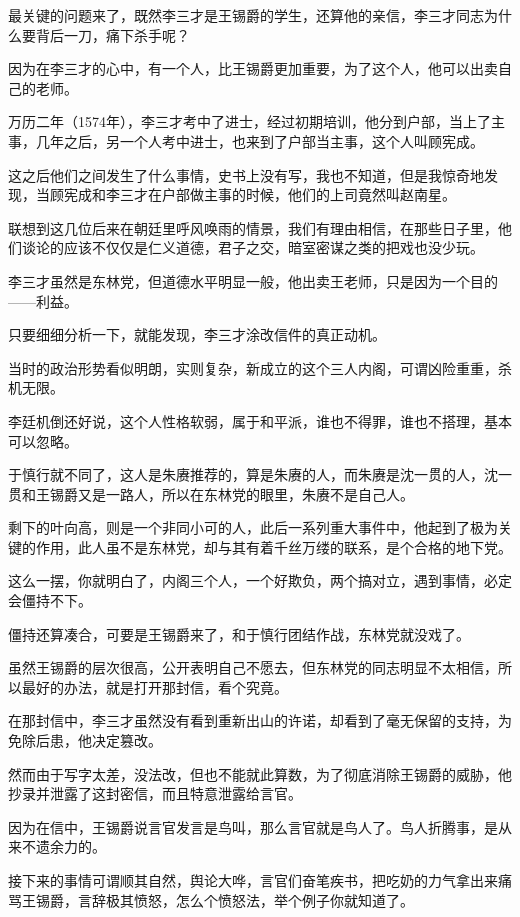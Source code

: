 \begin{multicols}{\theparacolNo}
最关键的问题来了，既然李三才是王锡爵的学生，还算他的亲信，李三才同志为什么要背后一刀，痛下杀手呢？

因为在李三才的心中，有一个人，比王锡爵更加重要，为了这个人，他可以出卖自己的老师。

万历二年（1574年），李三才考中了进士，经过初期培训，他分到户部，当上了主事，几年之后，另一个人考中进士，也来到了户部当主事，这个人叫顾宪成。

这之后他们之间发生了什么事情，史书上没有写，我也不知道，但是我惊奇地发现，当顾宪成和李三才在户部做主事的时候，他们的上司竟然叫赵南星。

联想到这几位后来在朝廷里呼风唤雨的情景，我们有理由相信，在那些日子里，他们谈论的应该不仅仅是仁义道德，君子之交，暗室密谋之类的把戏也没少玩。

李三才虽然是东林党，但道德水平明显一般，他出卖王老师，只是因为一个目的——利益。

只要细细分析一下，就能发现，李三才涂改信件的真正动机。

当时的政治形势看似明朗，实则复杂，新成立的这个三人内阁，可谓凶险重重，杀机无限。

李廷机倒还好说，这个人性格软弱，属于和平派，谁也不得罪，谁也不搭理，基本可以忽略。

于慎行就不同了，这人是朱赓推荐的，算是朱赓的人，而朱赓是沈一贯的人，沈一贯和王锡爵又是一路人，所以在东林党的眼里，朱赓不是自己人。

剩下的叶向高，则是一个非同小可的人，此后一系列重大事件中，他起到了极为关键的作用，此人虽不是东林党，却与其有着千丝万缕的联系，是个合格的地下党。

这么一摆，你就明白了，内阁三个人，一个好欺负，两个搞对立，遇到事情，必定会僵持不下。

僵持还算凑合，可要是王锡爵来了，和于慎行团结作战，东林党就没戏了。

虽然王锡爵的层次很高，公开表明自己不愿去，但东林党的同志明显不太相信，所以最好的办法，就是打开那封信，看个究竟。

在那封信中，李三才虽然没有看到重新出山的许诺，却看到了毫无保留的支持，为免除后患，他决定篡改。

然而由于写字太差，没法改，但也不能就此算数，为了彻底消除王锡爵的威胁，他抄录并泄露了这封密信，而且特意泄露给言官。

因为在信中，王锡爵说言官发言是鸟叫，那么言官就是鸟人了。鸟人折腾事，是从来不遗余力的。

接下来的事情可谓顺其自然，舆论大哗，言官们奋笔疾书，把吃奶的力气拿出来痛骂王锡爵，言辞极其愤怒，怎么个愤怒法，举个例子你就知道了。


\end{multicols}

